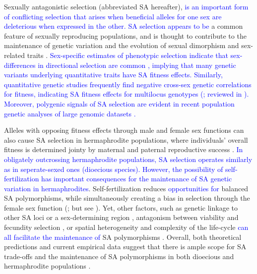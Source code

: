\documentclass[11pt]{article}
\begin{document}
Sexually antagonistic selection (abbreviated SA hereafter), \textcolor{blue}{is an important form of conflicting selection that arises when beneficial alleles for one sex are deleterious when expressed in the other. SA selection appears to be} a common feature of sexually reproducing populations, and is thought to contribute to the maintenance of genetic variation and the evolution of sexual dimorphism and sex-related traits \citep{Kidwell1977, Lande1980, Rice1992, Charlesworth1999, RiceChippindale2001, ConnallonClark2012, BondurianskyChenoweth2009, Olito2019}. \textcolor{blue}{Sex-specific estimates of phenotypic selection indicate that sex-differences in directional selection are common \citep[e.g.,][]{DeLisle-etal-2018,Lewis-etal-2011,CoxCalsbeek2009,SinghPunzalan2018}, implying that many genetic variants underlying quantitative traits have SA fitness effects. Similarly, quantitative genetic studies frequently find negative cross-sex genetic correlations for fitness, indicating SA fitness effects for multilocus genotypes (\citealt{Chippendale-etal-2001,Delph-etal-2011}; reviewed in \citealt{ConnallonMatthews2019}). Moreover, polygenic signals of SA selection are evident in recent population genetic analyses of large genomic datasets \citep{RuzickaESEB2020, RuzickaConnallon2022}.}

Alleles with opposing fitness effects through male and female sex functions can also cause SA selection in hermaphrodite populations, where individuals' overall fitness is determined jointy by maternal and paternal reproductive success \citep{LloydWebb1986, WebbLloyd1986, Abbott2011, JordanConnallon2014}. \textcolor{blue}{In obligately outcrossing hermaphrodite populations, SA selection operates similarly as in seperate-sexed ones (dioecious species). However, the possibility of self-fertilization has important consequences for the maintenance of SA genetic variation in hermaphrodites}. Self-fertilization reduces \textcolor{blue}{opportunities for} balanced SA polymorphisms, while simultaneously creating a bias in selection through the female sex function (\citealt{JordanConnallon2014,Glemin2021}; but see \citealt{Tazzyman2015}). Yet, other factors, such as genetic linkage to other SA loci or a sex-determining region \citep{Otto2011, JordanCharlesworth2012, Olito2017, Olito2019}, antagonism between viability and fecundity selection \citep{Glemin2021}, or spatial heterogeneity and complexity of the life-cycle \textcolor{blue}{can all facilitate the maintenance of} SA polymorphisms \citep{Olito-etal-2018,ConnallonSharmaOlito2019, Glemin2021}. Overall, both theoretical predictions and current empirical data suggest that there is ample scope for SA trade-offs and the maintenance of SA polymorphisms in both dioecious and hermaphrodite populations \citep{Abbott2011, DelphHerlihy2012, WangBarrett2020, RuzickaESEB2020, RuzickaConnallon2022}.
\end{document}
